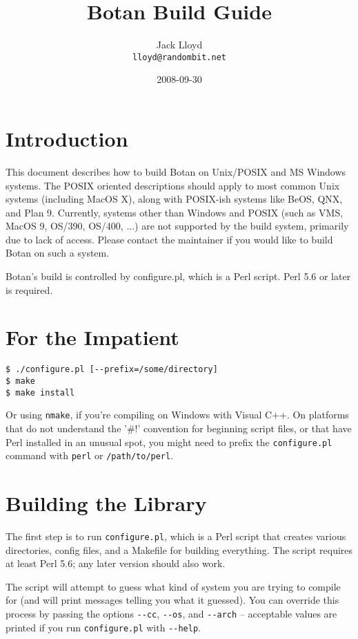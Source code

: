 \documentclass{article}
\title{\textbf{Botan Build Guide}}
\author{Jack Lloyd \\
        \texttt{lloyd@randombit.net}}
\date{2008-09-30}
\newcommand{\filename}[1]{\texttt{#1}}
\begin{document}
\maketitle

\tableofcontents

\parskip=5pt
\pagebreak

\section{Introduction}

This document describes how to build Botan on Unix/POSIX and MS
Windows systems. The POSIX oriented descriptions should apply to most
common Unix systems (including MacOS X), along with POSIX-ish systems
like BeOS, QNX, and Plan 9. Currently, systems other than Windows and
POSIX (such as VMS, MacOS 9, OS/390, OS/400, ...) are not supported by
the build system, primarily due to lack of access. Please contact the
maintainer if you would like to build Botan on such a system.

Botan's build is controlled by configure.pl, which is a Perl
script. Perl 5.6 or later is required.

\section{For the Impatient}

\begin{verbatim}
$ ./configure.pl [--prefix=/some/directory]
$ make
$ make install
\end{verbatim}

Or using \verb|nmake|, if you're compiling on Windows with Visual
C++. On platforms that do not understand the '\#!' convention for
beginning script files, or that have Perl installed in an unusual
spot, you might need to prefix the \texttt{configure.pl} command with
\texttt{perl} or \texttt{/path/to/perl}.

\section{Building the Library}

The first step is to run \filename{configure.pl}, which is a Perl
script that creates various directories, config files, and a Makefile
for building everything. The script requires at least Perl 5.6; any
later version should also work.

The script will attempt to guess what kind of system you are trying
to compile for (and will print messages telling you what it guessed).
You can override this process by passing the options \verb|--cc|,
\verb|--os|, and \verb|--arch| -- acceptable values are printed if
you run \verb|configure.pl| with \verb|--help|.
\end{document}
